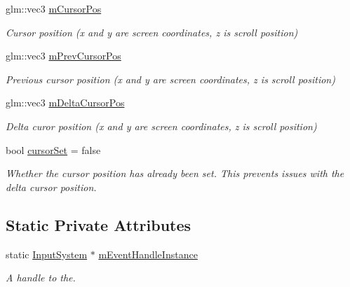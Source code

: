 \begin{DoxyCompactItemize}
\mbox{\label{class_input_system_ad38bf5cd99c3513e86e8f1fc1ddaa333}} 
glm\+::vec3 \mbox{\hyperlink{class_input_system_ad38bf5cd99c3513e86e8f1fc1ddaa333}{m\+Cursor\+Pos}}
\begin{DoxyCompactList}\small\item\em Cursor position (x and y are screen coordinates, z is scroll position) \end{DoxyCompactList}\item 
\mbox{\label{class_input_system_a43d50f5c3616d480923c91d49fb6a896}} 
glm\+::vec3 \mbox{\hyperlink{class_input_system_a43d50f5c3616d480923c91d49fb6a896}{m\+Prev\+Cursor\+Pos}}
\begin{DoxyCompactList}\small\item\em Previous cursor position (x and y are screen coordinates, z is scroll position) \end{DoxyCompactList}\item 
\mbox{\label{class_input_system_a36fd19cacfd8d662215fae1d711b9e18}} 
glm\+::vec3 \mbox{\hyperlink{class_input_system_a36fd19cacfd8d662215fae1d711b9e18}{m\+Delta\+Cursor\+Pos}}
\begin{DoxyCompactList}\small\item\em Delta curor position (x and y are screen coordinates, z is scroll position) \end{DoxyCompactList}\item 
\mbox{\label{class_input_system_a6354ba0247aa54692982ec6066b328c7}} 
bool \mbox{\hyperlink{class_input_system_a6354ba0247aa54692982ec6066b328c7}{cursor\+Set}} = false
\begin{DoxyCompactList}\small\item\em Whether the cursor position has already been set. This prevents issues with the delta cursor position. \end{DoxyCompactList}\end{DoxyCompactItemize}
\subsection*{Static Private Attributes}
\begin{DoxyCompactItemize}
\item 
\mbox{\label{class_input_system_a343fb827cca558fb4e2535be1df4e97d}} 
static \mbox{\hyperlink{class_input_system}{Input\+System}} $\ast$ \mbox{\hyperlink{class_input_system_a343fb827cca558fb4e2535be1df4e97d}{m\+Event\+Handle\+Instance}}
\begin{DoxyCompactList}\small\item\em A handle to the. \end{DoxyCompactList}\end{DoxyCompactItemize}


